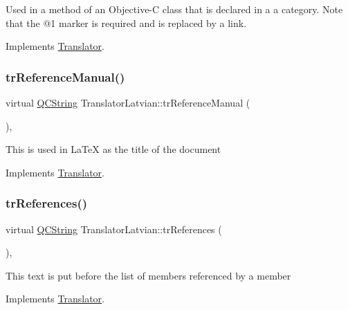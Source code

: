 Used in a method of an Objective-\/C class that is declared in a a category. Note that the @1 marker is required and is replaced by a link. 

Implements \mbox{\hyperlink{class_translator}{Translator}}.

\mbox{\label{class_translator_latvian_a38d9281f40c98c8a62afbedd3b473976}} 
\subsubsection{\texorpdfstring{trReferenceManual()}{trReferenceManual()}}
{\footnotesize\ttfamily virtual \mbox{\hyperlink{class_q_c_string}{Q\+C\+String}} Translator\+Latvian\+::tr\+Reference\+Manual (\begin{DoxyParamCaption}{ }\end{DoxyParamCaption})\hspace{0.3cm}{\ttfamily [inline]}, {\ttfamily [virtual]}}

This is used in La\+TeX as the title of the document 

Implements \mbox{\hyperlink{class_translator}{Translator}}.

\mbox{\label{class_translator_latvian_ad136c52938e2f02d801e4d69968956e2}} 
\subsubsection{\texorpdfstring{trReferences()}{trReferences()}}
{\footnotesize\ttfamily virtual \mbox{\hyperlink{class_q_c_string}{Q\+C\+String}} Translator\+Latvian\+::tr\+References (\begin{DoxyParamCaption}{ }\end{DoxyParamCaption})\hspace{0.3cm}{\ttfamily [inline]}, {\ttfamily [virtual]}}

This text is put before the list of members referenced by a member 

Implements \mbox{\hyperlink{class_translator}{Translator}}.

\mbox{\label{class_translator_latvian_aa00dd19fc14a067b0ec3b69c56402052}} 
